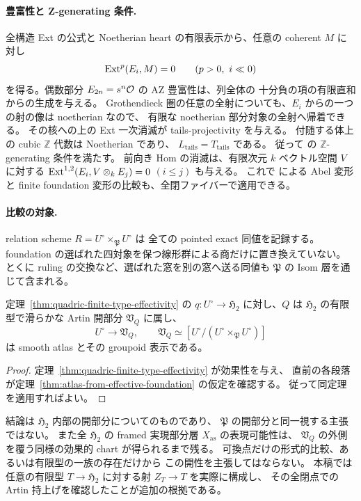 \paragraph{豊富性と Z-generating 条件.}
全構造 Ext の公式と Noetherian heart の有限表示から、任意の coherent $M$ に対し
\[
 \Ext^p(E_i,M)=0\qquad(p>0,\ i\ll0)
\]
を得る。偶数部分 $E_{2n}=s^n\mathcal O$ の AZ 豊富性は、列全体の
十分負の項の有限直和からの生成を与える。
Grothendieck 圏の任意の全射についても、$E_i$ からの一つの射の像は noetherian なので、
有限な noetherian 部分対象の全射へ帰着できる。
その核への上の Ext 一次消滅が tails-projectivity を与える。
付随する体上の cubic $\mathbb Z$ 代数は Noetherian であり、
$L_{\mathrm{tails}}=T_{\mathrm{tails}}$ である。
従って \cite[Corollary 3.16]{DeDekenLowen2011} の $\mathbb Z$-generating 条件を満たす。
前向き Hom の消滅は、有限次元 $k$ ベクトル空間 $V$ に対する
$\operatorname{Ext}^{1,2}(E_i,V\otimes_k E_j)=0$ $(i\leq j)$ も与える。
これで \cite[Theorems 4.5 and 5.15]{DeDekenLowen2011} による Abel 変形と
finite foundation 変形の比較も、全閉ファイバーで適用できる。

\paragraph{比較の対象.}
relation scheme $R=U^\circ\times_{\mathfrak P}U^\circ$ は
全ての pointed exact 同値を記録する。
foundation の選ばれた四対象を保つ線形群による商だけに置き換えていない。
とくに ruling の交換など、選ばれた窓を別の窓へ送る同値も
$\mathfrak P$ の Isom 層を通じて含まれる。

\begin{corollary}
\label{cor:quadric-effective-smooth-neighborhood}
定理~\ref{thm:quadric-finite-type-effectivity} の
$q:U^\circ\to\mathfrak H_2$ に対し、$Q$ は $\mathfrak H_2$ の有限型で滑らかな Artin 開部分
$\mathfrak V_Q$ に属し、
\[
 U^\circ\longrightarrow\mathfrak V_Q,
 \qquad
 \mathfrak V_Q\simeq
 [U^\circ/(U^\circ\times_{\mathfrak P}U^\circ)]
\]
は smooth atlas とその groupoid 表示である。
\end{corollary}
\begin{proof}
定理~\ref{thm:quadric-finite-type-effectivity} が効果性を与え、
直前の各段落が定理~\ref{thm:atlas-from-effective-foundation} の仮定を確認する。
従って同定理を適用すればよい。
\end{proof}

\begin{remark}[代数性について残る範囲]
結論は $\mathfrak H_2$ 内部の開部分についてのものであり、
$\mathfrak P$ の開部分と同一視する主張ではない。
また全 $\mathfrak H_2$ の framed 実現部分層 $X_{\mathrm{as}}$ の表現可能性は、
$\mathfrak V_Q$ の外側を覆う同様の効果的 chart が得られるまで残る。
可換点だけの形式的比較、あるいは有限型の一族の存在だけから
この開性を主張してはならない。
本稿では任意の有限型 $T\to\mathfrak H_2$ に対する射 $Z_T\to T$ を実際に構成し、
その全閉点での Artin 持上げを確認したことが追加の根拠である。
\end{remark}


